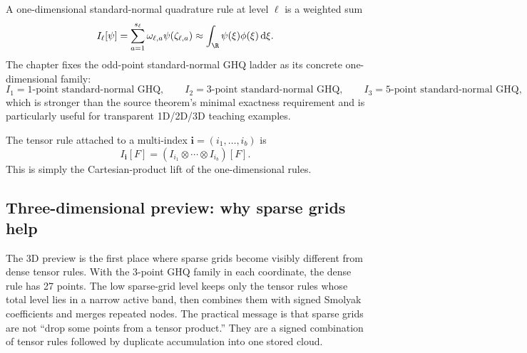 A one-dimensional standard-normal quadrature rule at level \(\ell\) is a weighted
sum
\begin{equation}
  I_\ell[\psi]
  =
  \sum_{a=1}^{s_\ell}\omega_{\ell,a}\psi(\zeta_{\ell,a})
  \approx
  \int_{\R}\psi(\xi)\phi(\xi)\dd \xi.
  \label{eq:p31-univariate-rule}
\end{equation}
The chapter fixes the odd-point standard-normal GHQ ladder as its concrete
one-dimensional family:
\begin{equation}
  I_1 = \text{1-point standard-normal GHQ},
  \qquad
  I_2 = \text{3-point standard-normal GHQ},
  \qquad
  I_3 = \text{5-point standard-normal GHQ},
  \label{eq:p41-ghq-family}
\end{equation}
which is stronger than the source theorem’s minimal exactness requirement and is
particularly useful for transparent 1D/2D/3D teaching examples.

The tensor rule attached to a multi-index \(\mathbf i=(i_1,\ldots,i_b)\) is
\begin{equation}
  I_{\mathbf i}[F]
  =
  (I_{i_1}\otimes\cdots\otimes I_{i_b})[F].
  \label{eq:p31-tensor-rule}
\end{equation}
This is simply the Cartesian-product lift of the one-dimensional rules.

\subsection{Three-dimensional preview: why sparse grids help}
\label{sec:p38-three-dimensional-preview}

The 3D preview is the first place where sparse grids become visibly different
from dense tensor rules.  With the 3-point GHQ family in each coordinate, the
dense rule has 27 points.  The low sparse-grid level keeps only the tensor rules
whose total level lies in a narrow active band, then combines them with signed
Smolyak coefficients and merges repeated nodes.  The practical message is that
sparse grids are not “drop some points from a tensor product.”  They are a
signed combination of tensor rules followed by duplicate accumulation into one
stored cloud.

